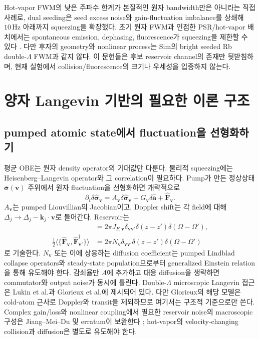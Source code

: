 \documentclass[11pt,a4paper]{article}
\begin{document}
Hot-vapor FWM의 낮은 주파수 한계가 본질적인 원자 bandwidth만은 아니라는 직접 사례로,
dual seeding은 seed excess noise와 gain-fluctuation imbalance를 상쇄해
$10\,\mathrm{Hz}$ 아래까지 squeezing을 확장했다\cite{Wu2019}. 초기 원자 FWM과
인접한 PSR/hot-vapor 배치에서는
spontaneous emission, dephasing, fluorescence가 squeezing을 제한할 수 있다
\cite{Slusher1987,Hsu2006}. 다만 후자의 geometry와 nonlinear process는 Sim의 bright
seeded Rb double-$\Lambda$ FWM과 같지 않다. 이 문헌들은 후보 reservoir channel의
존재만 뒷받침하며, 현재 실험에서 collision/fluorescence의 크기나 우세성을 입증하지
않는다.

\section{양자 Langevin 기반의 필요한 이론 구조}

\subsection{pumped atomic state에서 fluctuation을 선형화하기}

평균 OBE는 원자 density operator의 기대값만 다룬다. 물리적 squeezing에는
Heisenberg--Langevin operator와 그 correlation이 필요하다. Pump가 만든 정상상태
$\bar{\bm\sigma}(\bm v)$ 주위에서 원자 fluctuation을 선형화하면 개략적으로
\begin{equation}
\partial_t\delta\hat{\bm\sigma}_{\bm v}
=A_{\bm v}\delta\hat{\bm\sigma}_{\bm v}
+G_{\bm v}\delta\hat{\bm a}
+\hat{\bm F}_{\bm v}.
\label{eq:atomic-langevin}
\end{equation}
$A_{\bm v}$는 pumped Liouvillian의 Jacobian이고, Doppler shift는 각 field에 대해
$\Delta_j\rightarrow\Delta_j-\bm k_j\!\cdot\!\bm v$로 들어간다. Reservoir는
\begin{align}
[\hat{\bm F}_{\bm v}(z,\Omega),
\hat{\bm F}_{\bm v'}^\dagger(z',\Omega')]&=
2\pi J_{F,\bm v}\delta_{\bm v\bm v'}\delta(z-z')\delta(\Omega-\Omega'),\\
\tfrac12\langle\{\hat{\bm F}_{\bm v},
\hat{\bm F}_{\bm v'}^\dagger\}\rangle&=
2\pi N_{\bm v}\delta_{\bm v\bm v'}\delta(z-z')\delta(\Omega-\Omega')
\end{align}
로 기술한다. $N_{\bm v}$ 또는 이에 상응하는 diffusion coefficient는 pumped Lindblad
collapse operators와 steady-state population으로부터 generalized Einstein relation을
통해 유도해야 한다. 감쇠율만 $A$에 추가하고 대응 diffusion을 생략하면 commutator와
output noise가 동시에 틀린다. Double-$\Lambda$ microscopic Langevin 접근은
Lukin et al.과 Glorieux et al.에 제시되어 있다\cite{Lukin1999,Glorieux2010}.
다만 Glorieux의 해당 모델은 cold-atom 근사로 Doppler와 transit을 제외하므로 여기서는
구조적 기준으로만 쓴다. Complex gain/loss와 nonlinear coupling에서 필요한 reservoir
noise의 macroscopic 구성은 Jiang--Mei--Du 및 erratum이 보완한다
\cite{Jiang2023,Jiang2025Erratum}; hot-vapor의 velocity-changing collision과 diffusion은
별도로 유도해야 한다.
\end{document}
